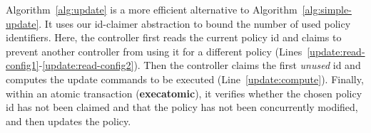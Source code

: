\documentclass[conference]{sigcomm-alternate}
\newcommand{\hide}[1]{}
\begin{document}
Algorithm~\ref{alg:update} is a more efficient alternative 
to Algorithm~\ref{alg:simple-update}. It uses our id-claimer abstraction
to bound the number of used policy identifiers.
Here, the controller first reads the current policy id and claims to prevent another controller from using it 
for a
different policy (Lines~\ref{update:read-config1}-\ref{update:read-config2}).
Then the controller claims the first \emph{unused} id and computes the update commands to be executed (Line~\ref{update:compute}).
Finally, within an atomic transaction (\textbf{execatomic}), it verifies whether the chosen policy id has not
been claimed and that
the policy has not been concurrently modified, and then updates the policy.


\hide{
We compute our new suggested policy by applying the update requests on
top of current policy, supporting any kind of requests and
policies. Then we make a transaction (using the bundle feature) to
atomically check that our policy id is not blocked by another controller, to change the current policy id to ours (an action that would fail if the current policy id is no longer what we are counting of) and to actually configure our new policy.

If one of the actions in the transaction fails we try again. There is no progress guaranty for each controller but there is one for the whole system - at least one of the controller will succeed in fulfilling its update requirements.
}
\end{document}
